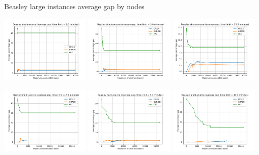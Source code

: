 \documentclass{article}
\begin{document}
	\begin{center}
		Beasley large instances average gap by nodes
		
		\includegraphics[width=0.32\textwidth]{Beasley SS large 120 - Average gap x Nodes}
		\includegraphics[width=0.32\textwidth]{Beasley SS large 300 - Average gap x Nodes}
		\includegraphics[width=0.32\textwidth]{Beasley SS large 600 - Average gap x Nodes}
		
		\includegraphics[width=0.32\textwidth]{Beasley MS large 120 - Average gap x Nodes}
		\includegraphics[width=0.32\textwidth]{Beasley MS large 300 - Average gap x Nodes}
		\includegraphics[width=0.32\textwidth]{Beasley MS large 600 - Average gap x Nodes}
	\end{center}
\end{document}
